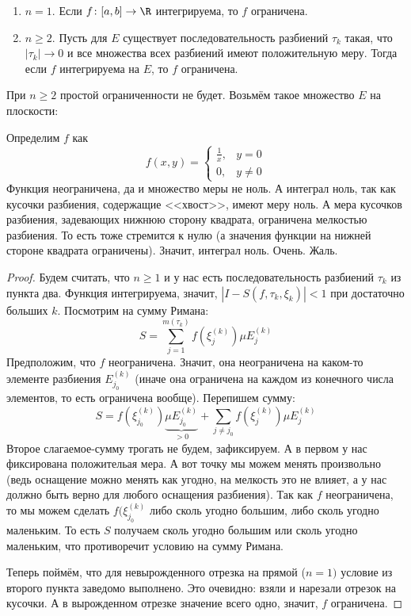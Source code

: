 \begin{theorem}
	\begin{enumerate}
	\item $n=1$. Если $f \colon [a,b] \to \R$ интегрируема, то $f$ ограничена.
	\item
		$n \ge 2$. Пусть для $E$ существует последовательность разбиений $\tau_k$ такая, что
		$|\tau_k| \to 0$ и все множества всех разбиений имеют положительную меру.
		Тогда если $f$ интегрируема на $E$, то $f$ ограничена.
	\end{enumerate}
\end{theorem}
\begin{Rem}
	При $n \ge 2$ простой ограниченности не будет.
	Возьмём такое множество $E$ на плоскости:
	\begin{center}
	
	\end{center}
	Определим $f$ как
	\[
		f(x, y) =
		\begin{cases}
			\frac 1 x, & y=0\\
			0,         & y\neq 0
		\end{cases}
	\]
	Функция неограничена, да и множество меры не ноль.
	А интеграл ноль, так как кусочки разбиения, содержащие <<хвост>>, имеют меру ноль.
	А мера кусочков разбиения, задевающих нижнюю сторону квадрата, ограничена мелкостью разбиения.
	То есть тоже стремится к нулю (а значения функции на нижней стороне квадрата ограничены).
	Значит, интеграл ноль.
	Очень. Жаль.
\end{Rem}
\begin{proof}
	Будем считать, что $n\ge 1$ и у нас есть последовательность разбиений $\tau_k$ из пункта два.
	Функция интегрируема, значит, $|I-S(f,\tau_k,\xi_k)|<1$ при достаточно больших $k$.
	Посмотрим на сумму Римана:
	\[
		S=\sum_{j=1}^{m(\tau_k)} f(\xi_j^{(k)}) \mu E_j^{(k)}
	\]
	Предположим, что $f$ неограничена.
	Значит, она неограничена на каком-то элементе разбиения $E_{j_0}^{(k)}$
	(иначе она ограничена на каждом из конечного числа элементов, то есть ограничена вообще).
	Перепишем сумму:
	\[
		S=f(\xi_{j_0}^{(k)}) \underbrace{\mu E_{j_0}^{(k)}}_{>0} + \sum_{j\neq j_0} f(\xi_j^{(k)}) \mu E_j^{(k)}
	\]
	Второе слагаемое-сумму трогать не будем, зафиксируем.
	А в первом у нас фиксирована положительая мера.
	А вот точку мы можем менять произвольно (ведь оснащение можно менять как угодно, на мелкость это не влияет,
	а у нас должно быть верно для любого оснащения разбиения).
	Так как $f$ неограничена, то мы можем сделать $f(\xi_{j_0}^{(k)}$ либо сколь угодно большим,
	либо сколь угодно маленьким.
	То есть $S$ получаем сколь угодно большим или сколь угодно маленьким, что противоречит условию на сумму Римана.

	Теперь поймём, что для невырожденного отрезка на прямой ($n=1)$ условие из второго пункта заведомо выполнено.
	Это очевидно: взяли и нарезали отрезок на кусочки.
	А в вырожденном отрезке значение всего одно, значит, $f$ ограничена.
\end{proof}
